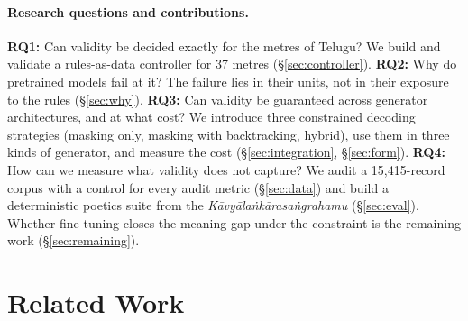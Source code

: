 \documentclass[11pt]{article}
\begin{document}
\paragraph{Research questions and contributions.}
\textbf{RQ1:} Can validity be decided exactly for the metres of Telugu? We build and validate a rules-as-data
controller for 37 metres (\S\ref{sec:controller}). \textbf{RQ2:} Why do pretrained models fail at it? The
failure lies in their units, not in their exposure to the rules (\S\ref{sec:why}). \textbf{RQ3:} Can
validity be guaranteed across generator architectures, and at what cost? We introduce three constrained
decoding strategies (masking only, masking with backtracking, hybrid), use them in three kinds of generator,
and measure the cost (\S\ref{sec:integration}, \S\ref{sec:form}). \textbf{RQ4:} How
can we measure what validity does not capture? We audit a 15,415-record corpus with a control for every
audit metric (\S\ref{sec:data}) and build a deterministic poetics suite from the
\textit{Kāvyālaṅkārasaṅgrahamu} \citep{ramarajabhushana_kas1920} (\S\ref{sec:eval}). Whether fine-tuning
closes the meaning gap under the constraint is the remaining work (\S\ref{sec:remaining}).

\section{Related Work}
\end{document}
